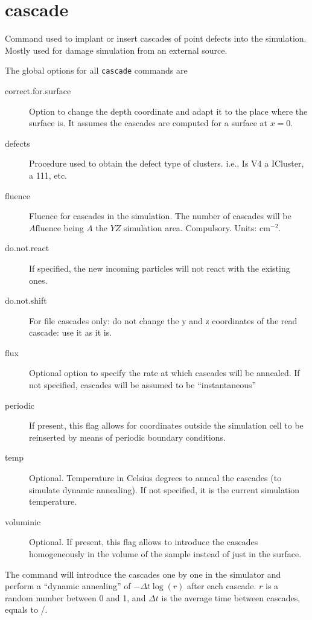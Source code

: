 \section{cascade}

Command used to implant or insert cascades of point defects into the simulation. Mostly used for damage simulation from an external source.

The global options for all {\tt cascade} commands are

\begin{description}
\item[correct.for.surface] Option to change the depth coordinate and adapt it to the place where the surface is. It assumes the cascades are computed for a surface at $x=0$.
\item[defects] Procedure used to obtain the defect type of clusters. i.e., Is V4 a ICluster, a 111, etc.
\item[fluence] Fluence for cascades in the simulation. The number of cascades will be $A\mathrm{fluence}$ being $A$ the $YZ$ simulation area. Compulsory. Units: cm$^{-2}$.
\item[do.not.react] If specified, the new incoming particles will not react with the existing ones.
\item[do.not.shift] For file cascades only: do not change the y and z coordinates of the read cascade: use it as it is.
\item[flux] Optional option to specify the rate at which cascades will be annealed. If not specified, cascades will be assumed to be ``instantaneous''
\item[periodic] If present, this flag allows for coordinates outside the simulation cell to be reinserted by means of periodic boundary conditions.
\item[temp] Optional. Temperature in Celsius degrees to anneal the cascades (to simulate dynamic annealing). If not specified, it is the current simulation temperature.
\item[voluminic] Optional. If present, this flag allows to introduce the cascades homogeneously in the volume of the sample instead of just in the surface.
\end{description}

The command  will introduce the cascades one by one in the simulator and perform a ``dynamic annealing'' of $-\Delta t\log(r)$ after each cascade. $r$ is a random number between 0 and 1, and $\Delta t$ is the average time between cascades, equals to /.


